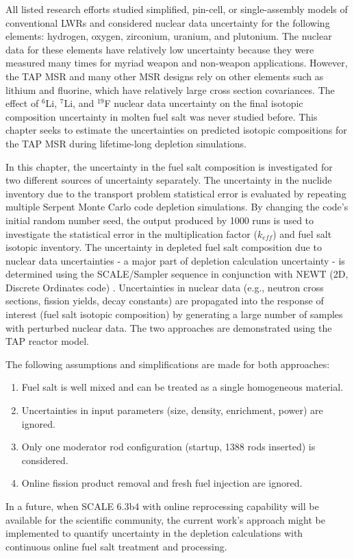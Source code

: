 All listed research efforts studied simplified, pin-cell, or single-assembly 
models of conventional \glspl{LWR} and considered nuclear data uncertainty for 
the following elements: hydrogen, oxygen, zirconium, uranium, and plutonium. 
The nuclear data for these elements have relatively low uncertainty because 
they were measured many times for myriad weapon and non-weapon applications. 
However, the \gls{TAP} \gls{MSR} and many other \gls{MSR} designs rely on 
other elements such as lithium and fluorine, which have relatively large cross 
section covariances. The effect of $^6$Li, $^7$Li, and $^{19}$F nuclear data 
uncertainty on the final isotopic composition uncertainty in molten fuel salt 
was never studied before. This chapter seeks to estimate the uncertainties on 
predicted isotopic compositions for the \gls{TAP} \gls{MSR} during 
lifetime-long depletion simulations.

In this chapter, the uncertainty in the fuel salt composition is investigated 
for two different sources of uncertainty separately. The uncertainty in the 
nuclide inventory due to the transport problem statistical error is evaluated 
by repeating multiple Serpent Monte Carlo code depletion simulations. By 
changing the code's initial random number seed, the output produced by 1000 
runs is used to investigate the statistical error in the multiplication factor 
($k_{eff}$) and fuel salt isotopic inventory. The uncertainty in depleted fuel 
salt composition due to nuclear data uncertainties - a major part of depletion 
calculation uncertainty - is determined using the SCALE/Sampler sequence in 
conjunction with NEWT (2D, Discrete Ordinates code) \cite{rearden_scale_2018}. 
Uncertainties in nuclear data (e.g., neutron cross sections, fission yields, 
decay constants) are propagated into the response of interest (fuel salt 
isotopic composition) by generating a large number of samples with perturbed 
nuclear data. The two approaches are demonstrated using the \gls{TAP} reactor 
model.

The following assumptions and simplifications are made for both approaches:
\begin{enumerate}[label=(\alph*), noitemsep, topsep=0pt]
	\item Fuel salt is well mixed and can be treated as a single homogeneous 
	material.
	\item Uncertainties in input parameters (size, density, enrichment, power) 
	are ignored.
	\item Only one moderator rod configuration (startup, 1388 rods inserted) 
	is considered.
	\item Online fission product removal and fresh fuel injection are ignored.
\end{enumerate}
In a future, when SCALE 6.3b4 with online reprocessing capability 
\cite{rykhlevskii_fuel_2019, betzler_modeling_2020} will be 
available for the scientific community, the current work's approach might be 
implemented to quantify uncertainty in the depletion calculations with 
continuous online fuel salt treatment and processing.


